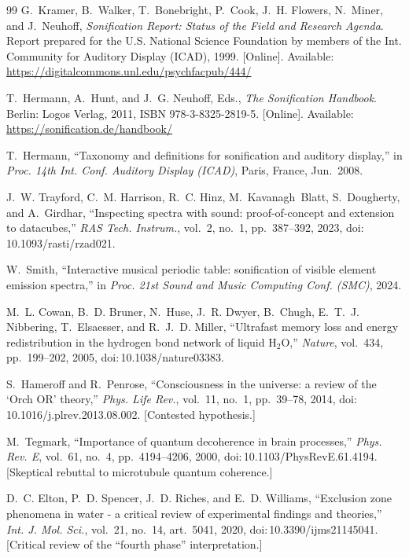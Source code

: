 \documentclass[11pt]{article}
\theoremstyle{definition}
\begin{document}
\begin{thebibliography}{99}
G.~Kramer, B.~Walker, T.~Bonebright, P.~Cook, J.~H. Flowers, N.~Miner, and J.~Neuhoff,
\emph{Sonification Report: Status of the Field and Research Agenda}. Report prepared for the
U.S. National Science Foundation by members of the Int. Community for Auditory Display
(ICAD), 1999. [Online]. Available: \url{https://digitalcommons.unl.edu/psychfacpub/444/}

T.~Hermann, A.~Hunt, and J.~G. Neuhoff, Eds., \emph{The Sonification Handbook}. Berlin:
Logos Verlag, 2011, ISBN 978-3-8325-2819-5. [Online]. Available:
\url{https://sonification.de/handbook/}

T.~Hermann, ``Taxonomy and definitions for sonification and auditory display,'' in
\emph{Proc. 14th Int. Conf. Auditory Display (ICAD)}, Paris, France, Jun.\ 2008.

J.~W. Trayford, C.~M. Harrison, R.~C. Hinz, M.~Kavanagh~Blatt, S.~Dougherty, and A.~Girdhar,
``Inspecting spectra with sound: proof-of-concept and extension to datacubes,'' \emph{RAS
Tech. Instrum.}, vol.~2, no.~1, pp.~387--392, 2023, doi:\,10.1093/rasti/rzad021.

W.~Smith, ``Interactive musical periodic table: sonification of visible element emission
spectra,'' in \emph{Proc. 21st Sound and Music Computing Conf. (SMC)}, 2024.

M.~L. Cowan, B.~D. Bruner, N.~Huse, J.~R. Dwyer, B.~Chugh, E.~T.~J. Nibbering,
T.~Elsaesser, and R.~J.~D. Miller, ``Ultrafast memory loss and energy redistribution in the
hydrogen bond network of liquid H$_2$O,'' \emph{Nature}, vol.~434, pp.~199--202, 2005,
doi:\,10.1038/nature03383.

S.~Hameroff and R.~Penrose, ``Consciousness in the universe: a review of the `Orch OR'
theory,'' \emph{Phys. Life Rev.}, vol.~11, no.~1, pp.~39--78, 2014,
doi:\,10.1016/j.plrev.2013.08.002. [Contested hypothesis.]

M.~Tegmark, ``Importance of quantum decoherence in brain processes,'' \emph{Phys. Rev. E},
vol.~61, no.~4, pp.~4194--4206, 2000, doi:\,10.1103/PhysRevE.61.4194. [Skeptical rebuttal to
microtubule quantum coherence.]

D.~C. Elton, P.~D. Spencer, J.~D. Riches, and E.~D. Williams, ``Exclusion zone phenomena in
water - a critical review of experimental findings and theories,'' \emph{Int. J. Mol.
Sci.}, vol.~21, no.~14, art.~5041, 2020, doi:\,10.3390/ijms21145041. [Critical review of the
``fourth phase'' interpretation.]


\end{thebibliography}
\end{document}
